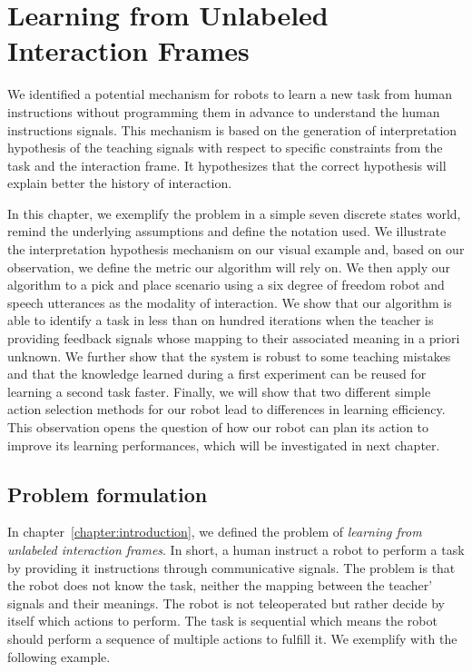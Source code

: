 
\chapter{Learning from Unlabeled Interaction Frames}
\label{chapter:lfui}
\minitoc

We identified a potential mechanism for robots to learn a new task from human instructions without programming them in advance to understand the human instructions signals. This mechanism is based on the generation of interpretation hypothesis of the teaching signals with respect to specific constraints from the task and the interaction frame. It hypothesizes that the correct hypothesis will explain better the history of interaction.

In this chapter, we exemplify the problem in a simple seven discrete states world, remind the underlying assumptions and define the notation used. We illustrate the interpretation hypothesis mechanism on our visual example and, based on our observation, we define the metric our algorithm will rely on. We then apply our algorithm to a pick and place scenario using a six degree of freedom robot and speech utterances as the modality of interaction. We show that our algorithm is able to identify a task in less than on hundred iterations when the teacher is providing feedback signals whose mapping to their associated meaning in a priori unknown. We further show that the system is robust to some teaching mistakes and that the knowledge learned during a first experiment can be reused for learning a second task faster. Finally, we will show that two different simple action selection methods for our robot lead to differences in learning efficiency. This observation opens the question of how our robot can plan its action to improve its learning performances, which will be investigated in next chapter.

\section{Problem formulation}

In chapter~\ref{chapter:introduction}, we defined the problem of \emph{learning from unlabeled interaction frames}. In short, a human instruct a robot to perform a task by providing it instructions through communicative signals. The problem is that the robot does not know the task, neither the mapping between the teacher' signals and their meanings. The robot is not teleoperated but rather decide by itself which actions to perform. The task is sequential which means the robot should perform a sequence of multiple actions to fulfill it. We exemplify with the following example.

